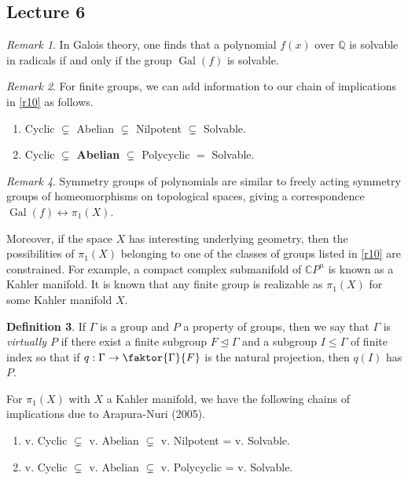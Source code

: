 \documentclass[10pt,letterpaper,cm]{nupset}
\theoremstyle{definition}
\newtheorem{definition}{Definition}[subsection]
\theoremstyle{theorem}
\theoremstyle{remark}
\newtheorem{remark}[definition]{Remark}
\newcommand{\CP}{\mathbb CP}
\newcommand{\Q}{\mathbb Q}
\newcommand{\1}{\mathbf{1}}
\newcommand{\0}{\vec 0}
\DeclareMathOperator{\gal}{Gal}
\begin{document}
\subsection{Lecture 6}

\begin{remark}
In Galois theory, one finds that a polynomial $f(x)$ over $\Q$ is solvable in radicals if and only if the group $\gal(f)$ is solvable. 
\end{remark}

\begin{remark}
For finite groups, we can add information to our chain of implications in \cref{r10} as follows.
\begin{enumerate}
\item Cyclic $\subsetneq$ Abelian $\subsetneq$ Nilpotent $\subsetneq$ Solvable.
\item Cyclic $\subsetneq$ \textbf{Abelian} $\subsetneq$ Polycyclic $\bm =$  Solvable.
\end{enumerate}
\end{remark}

\begin{remark}
Symmetry groups of polynomials are similar to freely acting symmetry groups of homeomorphisms on topological spaces, giving a correspondence $\gal(f) \longleftrightarrow \pi_1(X)$. 

Moreover, if the space $X$ has interesting underlying geometry, then the possibilities of $\pi_1(X)$ belonging to one of the classes of groups listed in \cref{r10} are constrained. For example,
a compact complex submanifold of $\CP^n$ is known as a Kahler manifold. It is known that any finite group is realizable as $\pi_1(X)$ for some Kahler manifold $X$.
\begin{definition}
If $\Gamma$ is a group and $P$ a property of groups, then we say that $\Gamma$ is \textit{virtually $P$} if there exist a finite subgroup $F \unlhd \Gamma$ and a subgroup $I \leq \Gamma$ of finite index so that if $q: \Gamma \to \faktor{\Gamma}{F}$ is the natural projection, then $q(I)$ has $P$. 
\end{definition}
For $\pi_1(X)$ with $X$ a Kahler manifold, we have the following chains of implications due to Arapura-Nuri (2005).
\begin{enumerate}
\item v. Cyclic $\subsetneq$ v. Abelian $\subsetneq$ v. Nilpotent = v. Solvable.
\item v. Cyclic $\subsetneq$ v. Abelian $\subsetneq$ v. Polycyclic = v. Solvable.
\end{enumerate}
\end{remark}
\end{document}
